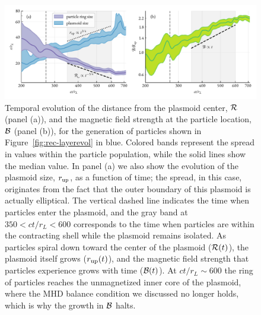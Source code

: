 \begin{figure}[tb]
    \includegraphics[width=\textwidth]{figures/ch2-reconnection/fig6.pdf}
    \caption{Temporal evolution of the distance from the plasmoid center, $\mathcal{R}$ (panel (a)), and the magnetic field strength at the particle location, $\mathcal{B}$ (panel (b)), for the generation of particles shown in Figure~\ref{fig:rec-layerevol} in blue. Colored bands represent the spread in values within the particle population, while the solid lines show the median value. In panel (a) we also show the evolution of the plasmoid size, $r_{\rm up}$, as a function of time; the spread, in this case, originates from the fact that the outer boundary of this plasmoid is actually elliptical. The vertical dashed line indicates the time when particles enter the plasmoid, and the gray band at $350<ct/r_L<600$ corresponds to the time when particles are within the contracting shell while the plasmoid remains isolated. As particles spiral down toward the center of the plasmoid ($\mathcal{R}(t)$), the plasmoid itself grows ($r_{\rm up}(t)$), and the magnetic field strength that particles experience grows with time ($\mathcal{B}(t)$). At $ct/r_L\sim 600$ the ring of particles reaches the unmagnetized inner core of the plasmoid, where the MHD balance condition we discussed no longer holds, which is why the growth in $\mathcal{B}$ halts.}
    \label{fig:rec-layer_r_b}
\end{figure}

